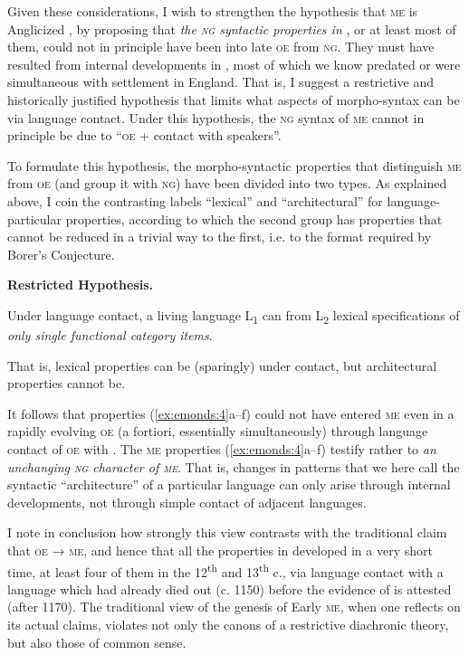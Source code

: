 \documentclass[output=paper]{LSP/langsci}
\begin{document}
Given these considerations, I wish to strengthen the hypothesis that \textsc{me} is Anglicized  , by proposing that \textit{the \textsc{ng} syntactic properties in} , or at least most of them, could not in principle have been  into late \textsc{oe} from \textsc{ng}. They must have resulted from internal developments in , most of which we know predated or were simultaneous with  settlement in England. That is, I suggest a restrictive and historically justified hypothesis that limits what aspects of morpho-syntax can be  via language contact. Under this hypothesis, the \textsc{ng} syntax of \textsc{me} cannot in principle be due to “\textsc{oe} + contact with  speakers”.

To formulate this hypothesis, the morpho-syntactic properties that distinguish \textsc{me} from \textsc{oe} (and group it with \textsc{ng}) have been divided into two types. As explained above, I coin the contrasting labels “lexical” and “architectural” for language-particular properties, according to which the second group has properties that cannot be reduced in a trivial way to the first, i.e. to the format required by Borer’s Conjecture.

\ea \label{ex:emonds:5}%
 \textbf{Restricted  Hypothesis.} 
 
 

Under language contact, a living language L\textsubscript{1} can  from L\textsubscript{2} lexical specifications of \textit{only single functional category items}. 
 \z
 
That is, lexical properties can be (sparingly)  under contact, but architectural properties cannot be. 

It follows that properties (\ref{ex:emonds:4}a--f) could not have entered \textsc{me} even in a rapidly evolving \textsc{oe} (a fortiori, essentially simultaneously) through language contact of \textsc{oe} with . The \textsc{me} properties (\ref{ex:emonds:4}a--f) testify rather to \textit{an unchanging \textsc{ng} character of \textsc{me}}. That is, changes in patterns that we here call the syntactic “architecture” of a particular language can only arise through internal developments, not through simple contact of adjacent languages. 

I note in conclusion how strongly this view contrasts with the traditional claim that \textsc{oe} → \textsc{me}, and hence that all the properties in  developed in a very short time, at least four of them in the 12\textsuperscript{th} and 13\textsuperscript{th} c., via language contact with a language which had already died out (c. 1150) before the evidence of  is attested (after 1170). The traditional view of the genesis of Early \textsc{me}, when one reflects on its actual claims, violates not only the canons of a restrictive diachronic theory, but also those of common sense.\pagebreak
 
\end{document}
